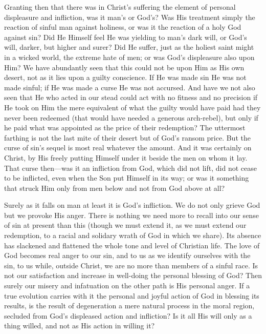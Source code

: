\documentclass[12pt,a5paper,twoside,titlepage]{book}
\begin{document}
Granting then that there was in Christ's suffering the 
element of personal displeasure and infliction, was it man's 
or God's? Was His treatment simply the reaction of 
sinful man against holiness, or was it the reaction of a 
holy God against sin? Did He Himself feel He was 
yielding to man's dark will, or God's will, darker, but 
higher and surer? Did He suffer, just as the holiest 
saint might in a wicked world, the extreme hate of 
men; or was God's displeasure also upon Him? We 
have abundantly seen that this could not be upon Him as 
His own desert, not as it lies upon a guilty conscience. 
If He was made sin He was not made sinful; if He was 
made a curse He was not accursed. And have we not 
also seen that He who acted in our stead could act with 
no fitness and no precision if He took on Him the mere 
equivalent of what the guilty would have paid had they 
never been redeemed (that would have needed a generous 
arch-rebel), but only if he paid what was appointed as the 
price of their redemption? The uttermost farthing is not 
the last mite of their desert but of God's ransom price. 
But the curse of sin's sequel is most real whatever the 
amount. And it was certainly on Christ, by His freely 
putting Himself under it beside the men on whom it lay. 
That curse then---was it an infliction from God, which did 
not lift, did not cease to be inflicted, even when the Son 
put Himself in its way; or was it something that struck 
Him only from men below and not from God above 
at all? 

Surely as it falls on man at least it is God's infliction. 
We do not only grieve God but we provoke His anger. 
There is nothing we need more to recall into our sense of 
sin at present than this (though we must extend it, as we 
must extend our redemption, to a racial and solidary 
wrath of God in which we share). Its absence has 
slackened and flattened the whole tone and level of 
Christian life. The love of God becomes real anger to 
our sin, and to us as we identify ourselves with the sin, 
to us while, outside Christ, we are no more than members 
of a sinful race. Is not our satisfaction and increase in 
well-doing the personal blessing of God? Then surely our 
misery and infatuation on the other path is His personal 
anger. If a true evolution carries with it the personal 
and joyful action of God in blessing its results, is the 
result of degeneration a mere natural process in the 
moral region, secluded from God's displeased action and 
infliction? Is it all His will only as a thing willed, and 
not as His action in willing it? 
\end{document}
